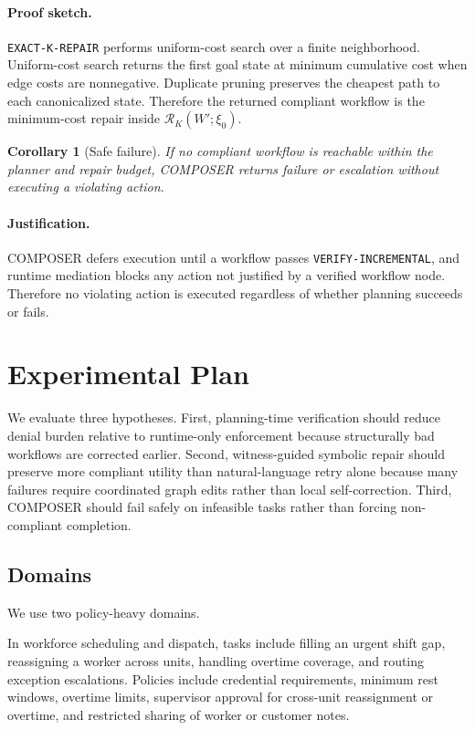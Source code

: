 \documentclass[11pt]{article}
\newtheorem{corollary}[definition]{Corollary}
\begin{document}
\paragraph{Proof sketch.}
\texttt{EXACT-K-REPAIR} performs uniform-cost search over a finite neighborhood. Uniform-cost search returns the first goal state at minimum cumulative cost when edge costs are nonnegative. Duplicate pruning preserves the cheapest path to each canonicalized state. Therefore the returned compliant workflow is the minimum-cost repair inside $\mathcal{R}_K(W';\xi_0)$.

\begin{corollary}[Safe failure]
If no compliant workflow is reachable within the planner and repair budget, COMPOSER returns failure or escalation without executing a violating action.
\end{corollary}

\paragraph{Justification.}
COMPOSER defers execution until a workflow passes \texttt{VERIFY-INCREMENTAL}, and runtime mediation blocks any action not justified by a verified workflow node. Therefore no violating action is executed regardless of whether planning succeeds or fails.

\section{Experimental Plan}
We evaluate three hypotheses. First, planning-time verification should reduce denial burden relative to runtime-only enforcement because structurally bad workflows are corrected earlier. Second, witness-guided symbolic repair should preserve more compliant utility than natural-language retry alone because many failures require coordinated graph edits rather than local self-correction. Third, COMPOSER should fail safely on infeasible tasks rather than forcing non-compliant completion.

\subsection{Domains}
We use two policy-heavy domains.

In workforce scheduling and dispatch, tasks include filling an urgent shift gap, reassigning a worker across units, handling overtime coverage, and routing exception escalations. Policies include credential requirements, minimum rest windows, overtime limits, supervisor approval for cross-unit reassignment or overtime, and restricted sharing of worker or customer notes.
\end{document}

